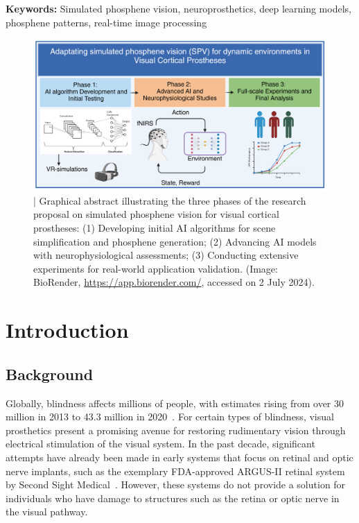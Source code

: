 \documentclass[10pt]{article}
\begin{document}
\textbf{Keywords:} Simulated  phosphene vision, neuroprosthetics, deep learning models, phosphene patterns, real-time image processing

\pagestyle{rest} %
\clearpage %

\begin{figure}[ht!]
  \centering
  \includegraphics[width=1.0\textwidth]{imgs/SPV_VCP_pipeline.png}
  \caption{| Graphical abstract illustrating the three phases of the research proposal on simulated phosphene vision for visual cortical prostheses: (1) Developing initial AI algorithms for scene simplification and phosphene generation; (2) Advancing AI models with neurophysiological assessments; (3) Conducting extensive experiments for real-world application validation. (Image: BioRender, \href{https://app.biorender.com/}{https://app.biorender.com/}, accessed on 2 July 2024).}\label{fig:graphical_abstract}
\end{figure}

\section*{Introduction}\label{sec:intro}
\subsection*{Background}\label{subsec:background}
Globally, blindness affects millions of people, with estimates rising from over
30 million in 2013 to 43.3 million in
2020~\parencite{stevensGlobalPrevalenceVision2013,bourneTrendsPrevalenceBlindness2021}.
For certain types of blindness, visual prosthetics present a promising avenue
for restoring rudimentary vision through electrical stimulation of the visual
system. In the past decade, significant attempts have already been made in early
systems that focus on retinal and optic nerve implants, such as the exemplary
FDA-approved ARGUS-II retinal system by Second Sight
Medical~\parencite{hoLongTermResultsEpiretinal2015}. However, these systems do
not provide a solution for individuals who have damage to structures such as the
retina or optic nerve in the visual pathway.
\end{document}
